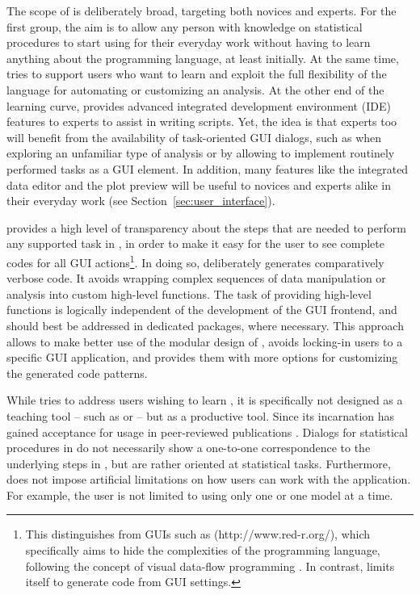 The scope of  is deliberately broad, targeting both  novices and experts.
For the first group, the aim is to allow any person with knowledge on
statistical procedures to start using  for their everyday work 
without having to learn anything about the  programming language,
at least initially. At the same time,  tries to support users who want to learn and
exploit the full flexibility of the  language for automating or customizing
an analysis. At the other end of the learning curve,  provides advanced integrated development environment (IDE)
features to  experts to assist in writing  scripts. Yet, the idea
is that  experts too will benefit from the availability of task-oriented GUI
dialogs, such as when exploring an unfamiliar type of analysis
or by allowing to implement routinely performed tasks as a GUI element. In
addition, many features like the integrated data editor and the plot preview 
will be useful to  novices and  experts alike in their everyday work
(see Section~\ref{sec:user_interface}).

 provides a high level of transparency about the steps that are needed to
perform any supported task in , in order to make it easy for the user to see
complete codes for all GUI actions\footnote{
  This distinguishes  from  GUIs such as  (http://www.red-r.org/), which 
  specifically aims to hide the complexities of the  programming language, following the concept of visual data-flow 
  programming \citep{Sutherland1966}. In contrast,  limits itself to generate  code from GUI settings.
}. In doing so,  deliberately generates
comparatively verbose code. It avoids wrapping complex sequences of data
manipulation or analysis into custom high-level  functions. The task of
providing high-level functions is logically independent of the development of the
GUI frontend, and should best be addressed in dedicated  packages, where necessary.
This approach allows to make better use of the modular design of , avoids
locking-in users to a specific GUI application, and provides them with more options for
customizing the generated code patterns.

While  tries to address users wishing to learn , it is specifically not
designed as a teaching tool -- such as  \citep{Fox2005} or  \citep{TeachingDemos2010} -- but as
a productive tool. Since its incarnation  has gained acceptance for usage in peer-reviewed 
publications \citep{Zou2008, Zou2009, Rugg-Gunn2010, Yang2011, Roediger2011, Roediger_VS}.
Dialogs for statistical procedures in  do not
necessarily show a one-to-one correspondence to the underlying steps in , but are
rather oriented at statistical tasks. Furthermore,  does not impose
artificial limitations on how users can work with the application. For example,
the user is not limited to using only one  or one model at a
time.


